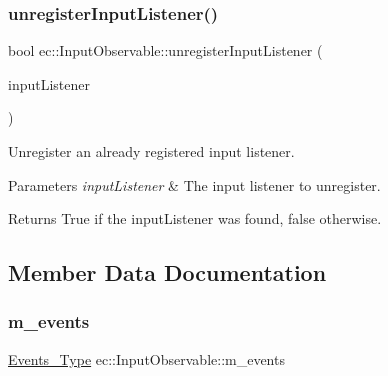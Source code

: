 \subsubsection{\texorpdfstring{unregister\+Input\+Listener()}{unregisterInputListener()}}
{\footnotesize\ttfamily bool ec\+::\+Input\+Observable\+::unregister\+Input\+Listener (\begin{DoxyParamCaption}\item[{\mbox{\hyperlink{classec_1_1_input_listener}{Input\+Listener}} $\ast$}]{input\+Listener }\end{DoxyParamCaption})\hspace{0.3cm}{\ttfamily [virtual]}}



Unregister an already registered input listener. 


\begin{DoxyParams}{Parameters}
{\em input\+Listener} & The input listener to unregister. \\
\hline
\end{DoxyParams}
\begin{DoxyReturn}{Returns}
True if the input\+Listener was found, false otherwise. 
\end{DoxyReturn}


\subsection{Member Data Documentation}
\mbox{\label{classec_1_1_input_observable_a26f25d660227364fe1a1be19671af09e}} 
\subsubsection{\texorpdfstring{m\+\_\+events}{m\_events}}
{\footnotesize\ttfamily \mbox{\hyperlink{classec_1_1_input_observable_ac2476cc82c72ba20dcd8d5c89794f577}{Events\+\_\+\+Type}} ec\+::\+Input\+Observable\+::m\+\_\+events\hspace{0.3cm}{\ttfamily [protected]}}

\mbox{\label{classec_1_1_input_observable_a05b1b085184216601228522319efbe56}} 
